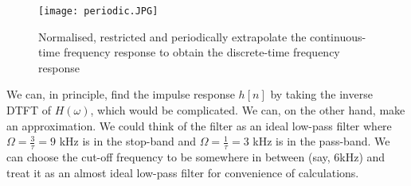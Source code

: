\begin{figure}[h] 
        \centering
        
                \texttt{[image: periodic.JPG]}
                \caption{Normalised, restricted and periodically extrapolate the continuous-time frequency response to obtain the discrete-time frequency response}
                \label{periodic}
        
\end{figure}
We can, in principle, find the impulse response $h[n]$ by taking the inverse DTFT of $H(\omega)$, which would be complicated. We can, on the other hand, make an approximation. We could think of the filter as an ideal low-pass filter where $\Omega = \frac{3}{\tau} = 9$ kHz is in the stop-band and $\Omega = \frac{1}{\tau} = 3$ kHz is in the pass-band. We can choose the cut-off frequency to be somewhere in between (say, 6kHz) and treat it as an almost ideal low-pass filter for convenience of calculations. 


